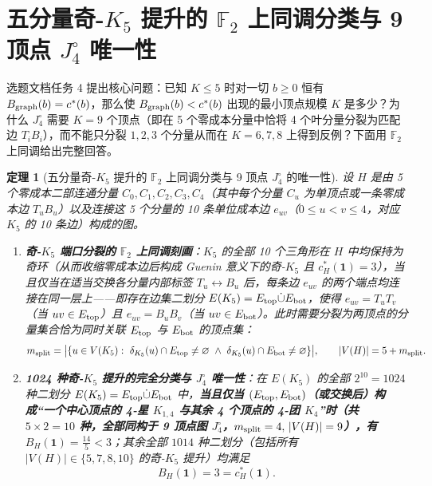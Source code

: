 \documentclass[11pt,a4paper]{ctexart}
\newtheorem{theorem}{定理}[section]
\theoremstyle{definition}
\newcommand{\FF}{\mathbb F}
\newcommand{\1}{\boldsymbol 1}
\newcommand{\0}{\boldsymbol 0}
\newcommand{\bgraph}{B_{\rm graph}}
\begin{document}
\section{五分量奇-$K_5$ 提升的 $\FF_2$ 上同调分类与 9 顶点 $J_4^\circ$ 唯一性}

选题文档任务 4 提出核心问题：已知 $K\le 5$ 时对一切 $b\ge 0$ 恒有 $\bgraph(b)=c^*(b)$，那么使 $\bgraph(b)<c^*(b)$ 出现的最小顶点规模 $K$ 是多少？为什么 $J_4^\circ$ 需要 $K=9$ 个顶点（即在 5 个零成本分量中恰将 4 个叶分量分裂为匹配边 $T_iB_i$），而不能只分裂 $1,2,3$ 个分量从而在 $K=6,7,8$ 上得到反例？下面用 $\FF_2$ 上同调给出完整回答。

\begin{theorem}[五分量奇-$K_5$ 提升的 $\FF_2$ 上同调分类与 9 顶点 $J_4^\circ$ 的唯一性]\label{thm:odd_K5_classification}
设 $H$ 是由 5 个零成本二部连通分量 $C_0,C_1,C_2,C_3,C_4$（其中每个分量 $C_u$ 为单顶点或一条零成本边 $T_uB_u$）以及连接这 5 个分量的 10 条单位成本边 $e_{uv}$（$0\le u<v\le 4$，对应 $K_5$ 的 10 条边）构成的图。
\begin{enumerate}[label=(\alph*)]
\item \textbf{奇-$K_5$ 端口分裂的 $\FF_2$ 上同调刻画}：$K_5$ 的全部 10 个三角形在 $H$ 中均保持为奇环（从而收缩零成本边后构成 Guenin 意义下的奇-$K_5$ 且 $c_H^*(\1)=3$），当且仅当在适当交换各分量内部标签 $T_u\leftrightarrow B_u$ 后，每条边 $e_{uv}$ 的两个端点均连接在同一层上——即存在边集二划分 $E(K_5)=E_{\rm top}\dot\cup E_{\rm bot}$，使得 $e_{uv}=T_uT_v$（当 $uv\in E_{\rm top}$）且 $e_{uv}=B_uB_v$（当 $uv\in E_{\rm bot}$）。此时需要分裂为两顶点的分量集合恰为同时关联 $E_{\rm top}$ 与 $E_{\rm bot}$ 的顶点集：
\begin{equation}\label{eq:K_count}
 m_{\rm split}=\bigl|\{u\in V(K_5):\ \delta_{K_5}(u)\cap E_{\rm top}\neq\varnothing\ \land\ \delta_{K_5}(u)\cap E_{\rm bot}\neq\varnothing\}\bigr|,\qquad |V(H)|=5+m_{\rm split}.
\end{equation}
\item \textbf{1024 种奇-$K_5$ 提升的完全分类与 $J_4^\circ$ 唯一性}：在 $E(K_5)$ 的全部 $2^{10}=1024$ 种二划分 $E(K_5)=E_{\rm top}\dot\cup E_{\rm bot}$ 中，\textbf{当且仅当 $(E_{\rm top},E_{\rm bot})$（或交换后）构成“一个中心顶点的 4-星 $K_{1,4}$ 与其余 4 个顶点的 4-团 $K_4$”时（共 $5\times 2=10$ 种，全部同构于 9 顶点图 $J_4^\circ$，$m_{\rm split}=4,\,|V(H)|=9$），有 $B_H(\1)=\frac{14}{5}<3$}；其余全部 $1014$ 种二划分（包括所有 $|V(H)|\in\{5,7,8,10\}$ 的奇-$K_5$ 提升）均满足
\begin{equation}\label{eq:other_1014}
 B_H(\1)=3=c_H^*(\1).
\end{equation}
\end{enumerate}
\end{theorem}
\end{document}
